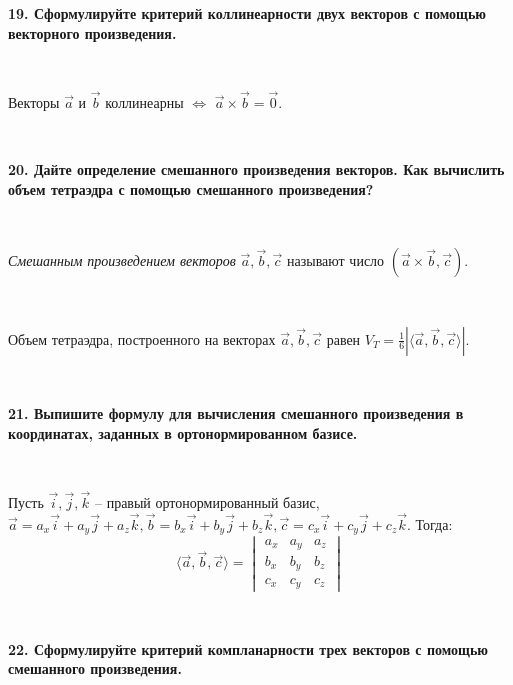 \documentclass{article}
\begin{document}
	\textbf{19. Сформулируйте критерий коллинеарности двух векторов с помощью векторного произведения.} 
	
	{
		$\;$
		\setlength{\parindent}{0.4cm}
		\hangindent=0.4cm
		
		Векторы $\overrightarrow{a}$ и $\overrightarrow{b}$ коллинеарны $ \Leftrightarrow$ $\overrightarrow{a}\times\overrightarrow{b}=\overrightarrow{0}$.
		
		$\;$
		\setlength{\parindent}{0cm}
		\hangindent=0cm
	}
	
	\textbf{20. Дайте определение смешанного произведения векторов. Как вычислить объем тетраэдра с помощью смешанного произведения?} 
	
	{
		$\;$
		\setlength{\parindent}{0.4cm}
		\hangindent=0.4cm
		
		\textit{Смешанным произведением векторов} $\overrightarrow{a}, \overrightarrow{b}, \overrightarrow{c}$ называют число $(\overrightarrow{a}\times\overrightarrow{b}, \overrightarrow{c})$. 
		
		$\;$
		
		Объем тетраэдра, построенного на векторах $\overrightarrow{a}, \overrightarrow{b}, \overrightarrow{c}$ равен $V_T=\frac{1}{6}|\langle\overrightarrow{a}, \overrightarrow{b},\overrightarrow{c}\rangle|$.
		
		$\;$
		\setlength{\parindent}{0cm}
		\hangindent=0cm
	}
	
	\textbf{21. Выпишите формулу для вычисления смешанного произведения в координатах, заданных в ортонормированном базисе.}
	
	{
		$\;$
		\setlength{\parindent}{0.4cm}
		\hangindent=0.4cm
		
		Пусть $\overrightarrow{i}, \overrightarrow{j}, \overrightarrow{k}$ -- правый ортонормированный базис, $\overrightarrow{a}=a_x\overrightarrow{i}+a_y\overrightarrow{j}+a_z\overrightarrow{k},  \overrightarrow{b}=b_x\overrightarrow{i}+b_y\overrightarrow{j}+b_z\overrightarrow{k}, \overrightarrow{c}=c_x\overrightarrow{i}+c_y\overrightarrow{j}+c_z\overrightarrow{k}$. Тогда: 
		$$\langle\overrightarrow{a}, \overrightarrow{b},\overrightarrow{c}\rangle=\begin{vmatrix}
		a_x&a_y&a_z\\
		b_x&b_y&b_z\\
		c_x&c_y&c_z
		\end{vmatrix}$$
		
		$\;$
		\setlength{\parindent}{0cm}
		\hangindent=0cm
	}
	
	\textbf{22. Сформулируйте критерий компланарности трех векторов с помощью смешанного произведения.}
	
\end{document}
